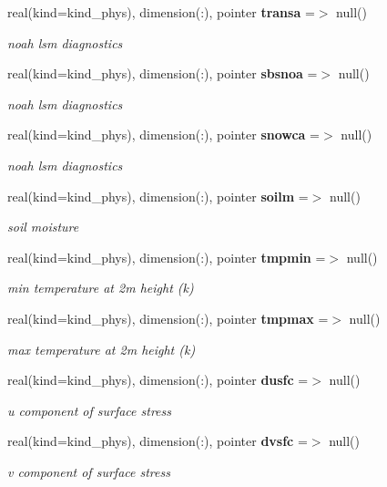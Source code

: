 \begin{DoxyCompactItemize}
real(kind=kind\+\_\+phys), dimension(\+:), pointer \textbf{ transa} =$>$ null()
\begin{DoxyCompactList}\small\item\em noah lsm diagnostics \end{DoxyCompactList}\item 
real(kind=kind\+\_\+phys), dimension(\+:), pointer \textbf{ sbsnoa} =$>$ null()
\begin{DoxyCompactList}\small\item\em noah lsm diagnostics \end{DoxyCompactList}\item 
real(kind=kind\+\_\+phys), dimension(\+:), pointer \textbf{ snowca} =$>$ null()
\begin{DoxyCompactList}\small\item\em noah lsm diagnostics \end{DoxyCompactList}\item 
real(kind=kind\+\_\+phys), dimension(\+:), pointer \textbf{ soilm} =$>$ null()
\begin{DoxyCompactList}\small\item\em soil moisture \end{DoxyCompactList}\item 
real(kind=kind\+\_\+phys), dimension(\+:), pointer \textbf{ tmpmin} =$>$ null()
\begin{DoxyCompactList}\small\item\em min temperature at 2m height (k) \end{DoxyCompactList}\item 
real(kind=kind\+\_\+phys), dimension(\+:), pointer \textbf{ tmpmax} =$>$ null()
\begin{DoxyCompactList}\small\item\em max temperature at 2m height (k) \end{DoxyCompactList}\item 
real(kind=kind\+\_\+phys), dimension(\+:), pointer \textbf{ dusfc} =$>$ null()
\begin{DoxyCompactList}\small\item\em u component of surface stress \end{DoxyCompactList}\item 
real(kind=kind\+\_\+phys), dimension(\+:), pointer \textbf{ dvsfc} =$>$ null()
\begin{DoxyCompactList}\small\item\em v component of surface stress \end{DoxyCompactList}\item 

\end{DoxyCompactItemize}
